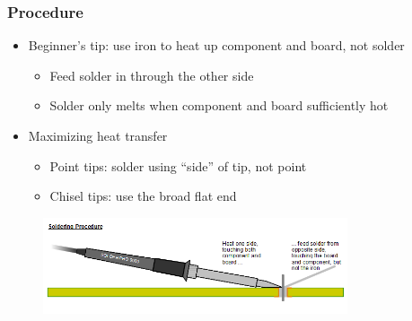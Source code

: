 \documentclass{beamer}
\begin{document}
\begin{frame}
\frametitle{Procedure}
\begin{itemize}
  \item Beginner's tip: use iron to heat up component and board, not solder
  \begin{itemize}
    \item Feed solder in through the other side
    \item Solder only melts when component and board sufficiently hot
  \end{itemize}
  \item Maximizing heat transfer
  \begin{itemize}
    \item Point tips: solder using ``side'' of tip, not point
    \item Chisel tips: use the broad flat end
  \end{itemize}
\end{itemize}
\begin{figure}
\centering
\includegraphics[width=0.8\textwidth,height=0.8\textheight,keepaspectratio]{images-dis1/solder-pth-technique}
\end{figure}
\end{frame}
\end{document}
